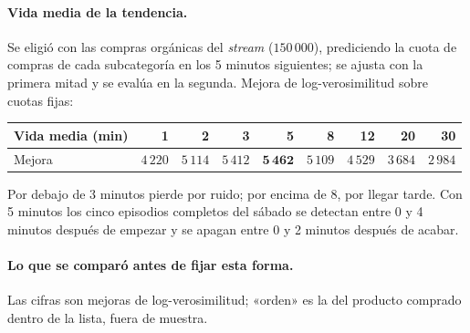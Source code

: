 \documentclass[11pt,a4paper]{article}
\begin{document}
\paragraph{Vida media de la tendencia.} Se eligió con las compras orgánicas del \emph{stream}
($150\,000$), prediciendo la cuota de compras de cada subcategoría en los 5 minutos siguientes; se
ajusta con la primera mitad y se evalúa en la segunda. Mejora de log-verosimilitud sobre cuotas fijas:

\begin{center}
\small
\begin{tabular}{lrrrrrrrr}
\toprule
Vida media (min) & 1 & 2 & 3 & 5 & 8 & 12 & 20 & 30\\
\midrule
Mejora & $4\,220$ & $5\,114$ & $5\,412$ & $\mathbf{5\,462}$ & $5\,109$ & $4\,529$ & $3\,684$ & $2\,984$\\
\bottomrule
\end{tabular}
\end{center}

Por debajo de 3 minutos pierde por ruido; por encima de 8, por llegar tarde. Con 5 minutos los cinco
episodios completos del sábado se detectan entre 0 y 4 minutos después de empezar y se apagan entre 0 y
2 minutos después de acabar.

\paragraph{Lo que se comparó antes de fijar esta forma.} Las cifras son mejoras de log-verosimilitud;
«orden» es la del producto comprado dentro de la lista, fuera de muestra.
\end{document}
